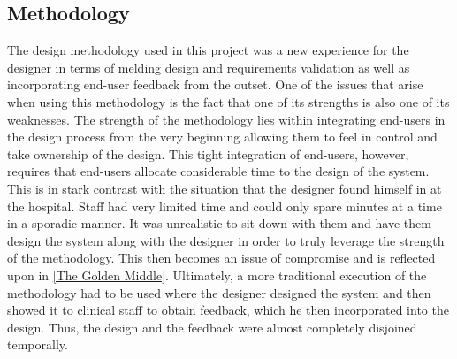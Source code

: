 \subsection{Methodology}
The design methodology used in this project was a new experience for the designer in terms of melding design and requirements validation as well as incorporating end-user feedback from the outset. One of the issues that arise when using this methodology is the fact that one of its strengths is also one of its weaknesses. The strength of the methodology lies within integrating end-users in the design process from the very beginning allowing them to feel in control and take ownership of the design. This tight integration of end-users, however, requires that end-users allocate considerable time to the design of the system. This is in stark contrast with the situation that the designer found himself in at the hospital. Staff had very limited time and could only spare minutes at a time in a sporadic manner. It was unrealistic to sit down with them and have them design the system along with the designer in order to truly leverage the strength of the methodology. This then becomes an issue of compromise and is reflected upon in \ref{The Golden Middle}. Ultimately, a more traditional execution of the methodology had to be used where the designer designed the system and then showed it to clinical staff to obtain feedback, which he then incorporated into the design. Thus, the design and the feedback were almost completely disjoined temporally.  

